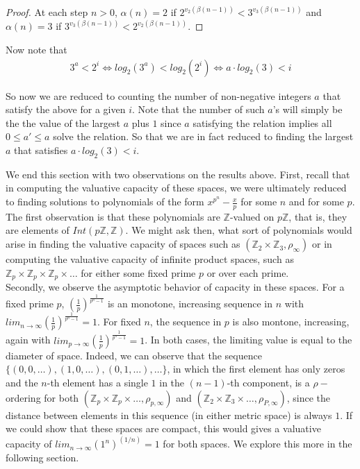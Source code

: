 \begin{proof}
At each step $n > 0$, $\alpha(n) = 2$ if $2^{v_2(\beta(n-1))} < 3^{v_3(\beta(n-1))}$ and  $\alpha(n) = 3$ if $3^{v_3(\beta(n-1))} < 2^{v_2(\beta(n-1))}$.
\end{proof}

 Now note that  
\begin{align}
3^a < 2^i
 \iff
 log_2(3^a) < log_2(2^i)
\iff  
a \cdot log_2(3) < i
\end{align}

So now we are reduced to counting the number of non-negative integers $a$ that satisfy the above for a given $i$.  Note that the number of such $a$'s will simply be the the value of the largest $a$ plus $1$ since $a$ satisfying the relation implies all $0 \leq a' \leq a$ solve the relation. So that we are in fact reduced to finding the largest $a$ that satisfies $a \cdot log_2(3) < i$.



We end this section with two observations on the results above.  First, recall that in computing the valuative capacity of these spaces, we were ultimately reduced to finding solutions to polynomials of the form $x^{p^n} - \frac{x}{p}$ for some $n$ and for some $p$. The first observation is that these polynomials are $\mathbb{Z}$-valued on $p\mathbb{Z}$, that is, they are elements of $Int(p\mathbb{Z},\mathbb{Z})$. We might ask then, what sort of polynomials would arise in finding the valuative capacity of spaces such as $(\mathbb{Z}_2 \times \mathbb{Z}_3, \rho_\infty)$ or in computing the valuative capacity of infinite product spaces, such as $\mathbb{Z}_p \times \mathbb{Z}_p \times \mathbb{Z}_p \times \ldots$ for either some fixed prime $p$ or over each prime. \\

Secondly, we observe the asymptotic behavior of capacity in these spaces. For a fixed prime $p$,  $(\frac{1}{p})^{\frac{1}{p^n-1}}$ is an monotone, increasing sequence in $n$ with $ lim_{n\to\infty} (\frac{1}{p})^{\frac{1}{p^n-1}} =  1$. For fixed $n$, the sequence in $p$ is also montone, increasing, again with  $ lim_{p\to\infty} (\frac{1}{p})^{\frac{1}{p^n-1}}=1$. In both cases, the limiting value is equal to the diameter of space. Indeed, we can observe that the sequence $\{(0,0,\ldots), (1,0,\ldots), (0,1,\ldots), \ldots\}$, in which the first element has only zeros and the $n$-th element has a single $1$ in the $(n-1)$-th component, is a $\rho-$ordering for both  $(\mathbb{Z}_p \times \mathbb{Z}_p \times \ldots, \rho_{p,\infty})$  and  $(\mathbb{Z}_2 \times \mathbb{Z}_3 \times \ldots, \rho_{P,\infty})$, since the distance between elements in this sequence (in either metric space) is always $1$. If we could show that these spaces are compact, this would gives a valuative capacity of $lim_{n\to\infty} (1^n)^{(1/n)} =1$ for both spaces. We explore this more in the following section.\\

